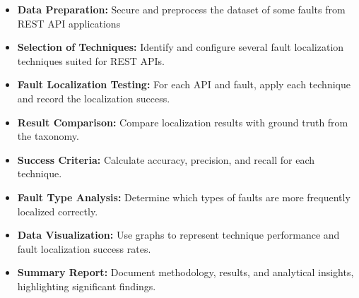 \documentclass[12pt, letterpaper]{article}
\begin{document}
\begin{itemize}
    \item \textbf{Data Preparation:} Secure and preprocess the dataset of some faults from REST API applications
    \item \textbf{Selection of Techniques:} Identify and configure several fault localization techniques suited for REST APIs.
    \item \textbf{Fault Localization Testing:} For each API and fault, apply each technique and record the localization success.
    \item \textbf{Result Comparison:} Compare localization results with ground truth from the taxonomy.
    \item \textbf{Success Criteria:} Calculate accuracy, precision, and recall for each technique.
    \item \textbf{Fault Type Analysis:} Determine which types of faults are more frequently localized correctly.
    \item \textbf{Data Visualization:} Use graphs to represent technique performance and fault localization success rates.
    \item \textbf{Summary Report:} Document methodology, results, and analytical insights, highlighting significant findings.
\end{itemize}
\end{document}
